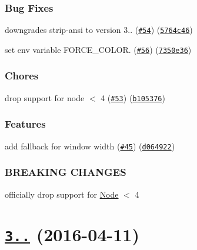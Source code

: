 \subsubsection*{Bug Fixes}


\begin{DoxyItemize}
\item downgrades strip-\/ansi to version 3.. (\href{https://github.com/yargs/cliui/issues/54}{\tt \#54}) (\href{https://github.com/yargs/cliui/commit/5764c46}{\tt 5764c46})
\item set env variable F\+O\+R\+C\+E\+\_\+\+C\+O\+L\+OR. (\href{https://github.com/yargs/cliui/issues/56}{\tt \#56}) (\href{https://github.com/yargs/cliui/commit/7350e36}{\tt 7350e36})
\end{DoxyItemize}

\subsubsection*{Chores}


\begin{DoxyItemize}
\item drop support for node $<$ 4 (\href{https://github.com/yargs/cliui/issues/53}{\tt \#53}) (\href{https://github.com/yargs/cliui/commit/b105376}{\tt b105376})
\end{DoxyItemize}

\subsubsection*{Features}


\begin{DoxyItemize}
\item add fallback for window width (\href{https://github.com/yargs/cliui/issues/45}{\tt \#45}) (\href{https://github.com/yargs/cliui/commit/d064922}{\tt d064922})
\end{DoxyItemize}

\subsubsection*{B\+R\+E\+A\+K\+I\+NG C\+H\+A\+N\+G\+ES}


\begin{DoxyItemize}
\item officially drop support for \mbox{\hyperlink{classNode}{Node}} $<$ 4
\end{DoxyItemize}

\label{_3.2.0}%
 \section*{\href{https://github.com/yargs/cliui/compare/v3.1.2...v3.2.0}{\tt 3..} (2016-\/04-\/11)}

